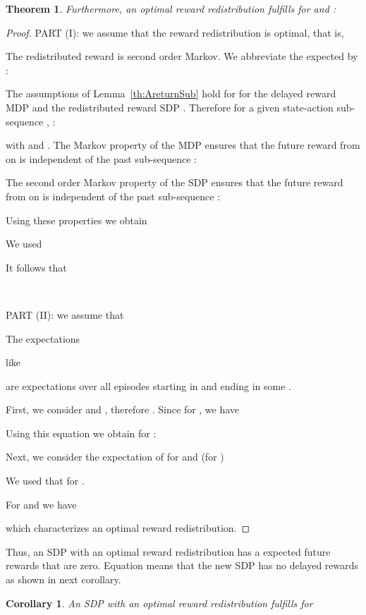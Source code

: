 \documentclass{article}
\newtheorem{theoremA}{Theorem}
\newtheorem{corollaryA}{Corollary}\newtheorem{propositionA}{Proposition}\newtheorem{lemmaA}{Lemma}\newtheorem{conjectureA}{Conjecture}
\begin{document}
\begin{appendices}
\begin{theoremA}
 
Furthermore, an optimal reward redistribution
fulfills for  and :
 
\end{theoremA}


\begin{proof}
\label{c:t2p}
PART (I): we assume that the reward redistribution is optimal, that is,
 
The redistributed reward  is second order Markov.
We abbreviate the expected  by :
  
  
The assumptions of Lemma~\ref{th:AreturnSub} hold for 
for the delayed reward MDP  and
the redistributed reward SDP . 
Therefore for a given state-action sub-sequence
, :

with
 and .
The Markov property of the MDP 
ensures that the future reward  from  on is independent of
the past sub-sequence :

The second order Markov property of the SDP 
ensures that the future reward from  on is independent of
the past sub-sequence :


Using these properties we obtain

We used


It follows that 
 

~~\newline
~~\newline



PART (II): we assume that
 

The expectations

like

are expectations over all episodes starting in 
and ending in some .

First, we consider  and  , therefore
.
Since   for , we have
 
Using this equation we obtain for :
 

Next, we consider the expectation of 
for  and  (for )

We used that  for .

For  and  we have

which characterizes an optimal reward redistribution.

\end{proof}
Thus, an SDP with an optimal reward redistribution 
has a expected future rewards that are zero.
Equation  means that the new SDP 
has no delayed rewards as shown in next corollary.
\begin{corollaryA}
\label{th:ApropDelay}
An SDP with an optimal reward redistribution
fulfills for  


\end{corollaryA}
\end{appendices}
\end{document}
